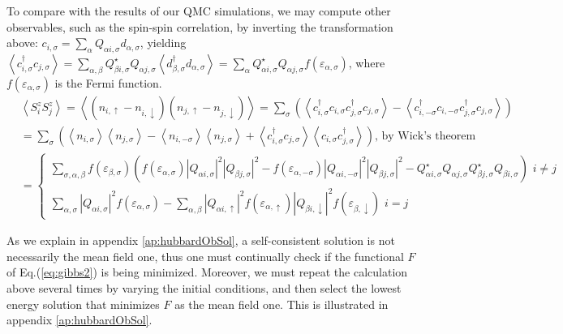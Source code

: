 To compare with the results of our \ac{QMC} simulations, we may compute other observables, such as the spin-spin correlation, by inverting the transformation above: $c_{i, \sigma} = \sum_{\alpha} Q_{\alpha i, \sigma} d_{\alpha, \sigma}$, yielding $\left\langle c_{i,\sigma}^\dagger c_{j,\sigma} \right\rangle = \sum_{\alpha, \beta} Q_{\beta i, \sigma}^\star Q_{\alpha j, \sigma} \left\langle d_{\beta,\sigma}^\dagger d_{\alpha,\sigma} \right\rangle = \sum_\alpha Q_{\alpha i, \sigma}^\star Q_{\alpha j, \sigma} f ( \varepsilon_{\alpha, \sigma} ) $, where $f (\varepsilon_{\alpha, \sigma})$ is the Fermi function.
\begin{equation}
\begin{split}
&\left\langle S_i^z S_j^z \right\rangle = \left\langle ( n_{i,\uparrow} -  n_{i,\downarrow} ) ( n_{j,\uparrow} -  n_{j,\downarrow} )  \right\rangle = \sum_{\sigma} \left( \left\langle c_{i,\sigma}^\dagger c_{i,\sigma} c_{j,\sigma}^\dagger c_{j,\sigma} \right\rangle - \left\langle c_{i,-\sigma}^\dagger c_{i,-\sigma} c_{j,\sigma}^\dagger c_{j,\sigma} \right\rangle \right) \\
&=\sum_{\sigma} \left( \left\langle n_{i,\sigma} \right\rangle \left\langle n_{j,\sigma} \right\rangle - \left\langle n_{i,-\sigma} \right\rangle \left\langle n_{j,\sigma} \right\rangle + \left\langle c_{i,\sigma}^\dagger c_{j,\sigma}  \right\rangle \left\langle c_{i,\sigma} c_{j,\sigma}^\dagger \right\rangle \right) , \, \text{by Wick's theorem} \\
&=
\begin{cases}
\sum_{\sigma, \alpha, \beta} f ( \varepsilon_{\beta, \sigma} ) \left( f ( \varepsilon_{\alpha, \sigma} ) | Q_{\alpha i, \sigma} |^2 | Q_{\beta j, \sigma} |^2  - f ( \varepsilon_{\alpha, -\sigma} ) | Q_{\alpha i, -\sigma} |^2 | Q_{\beta j, \sigma} |^2  - Q_{\alpha i, \sigma}^\star Q_{\alpha j, 
\sigma}  Q_{\beta j, \sigma}^\star Q_{\beta i, 
\sigma} \right) \,\, i \neq j \\
\sum_{\alpha,\sigma} | Q_{\alpha i, \sigma} |^2 f (\varepsilon_{\alpha, \sigma}) - \sum_{\alpha,\beta} | Q_{\alpha i, \uparrow} |^2 f (\varepsilon_{\alpha, \uparrow}) | Q_{\beta i, \downarrow} |^2 f (\varepsilon_{\beta, \downarrow}) \,\, i = j
\end{cases}
\end{split}
\end{equation}

As we explain in appendix \ref{ap:hubbardObSol}, a self-consistent solution is not necessarily the mean field one, thus one must continually check if the functional $F$ of Eq.(\ref{eq:gibbs2}) is being minimized.
Moreover, we must repeat the calculation above several times by varying the initial conditions, and then select the lowest energy solution that minimizes $F$ as the mean field one.
This is illustrated in appendix \ref{ap:hubbardObSol}.

